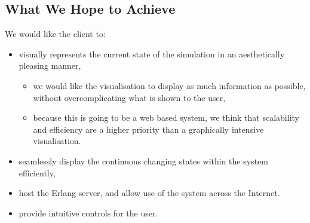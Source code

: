 \subsection{What We Hope to Achieve}
We would like the client to:
\begin{itemize}
	\item visually represents the current state of the simulation in an aesthetically pleasing manner,
	\begin{itemize}
		\item we would like the visualisation to display as much information as possible, without overcomplicating what is shown to the user,
		\item because this is going to be a web based system, we think that scalability and efficiency are a higher priority than a graphically intensive visualisation.
	\end{itemize}
	\item seamlessly display the continuous changing states within the system efficiently,
	\item host the Erlang server, and allow use of the system across the Internet.
	\item provide intuitive controls for the user.
\end{itemize}



\clearpage
\endinput
